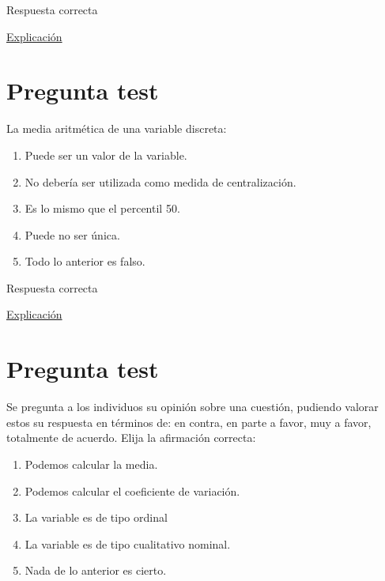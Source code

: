 \documentclass[
]{book}
\providecommand{\tightlist}{%
  \setlength{\itemsep}{0pt}\setlength{\parskip}{0pt}}
\begin{document}
Respuesta correcta

\href{https://1fjmanzano.github.io/bioestadistica/medidas-de-posicio\%CC\%81n-dispersio\%CC\%81n-y-forma.html\#medidas-de-posicio\%CC\%81n-no-centrales}{Explicación}

\hypertarget{pregunta-test-72}{%
\section{Pregunta test}\label{pregunta-test-72}}

La media aritmética de una variable discreta:

\begin{enumerate}
\def\labelenumi{\alph{enumi})}
\tightlist
\item
  Puede ser un valor de la variable.
\item
  No debería ser utilizada como medida de centralización.
\item
  Es lo mismo que el percentil 50.
\item
  Puede no ser única.
\item
  Todo lo anterior es falso.
\end{enumerate}

Respuesta correcta

\href{https://1fjmanzano.github.io/bioestadistica/medidas-de-posicio\%CC\%81n-dispersio\%CC\%81n-y-forma.html\#medidas-de-posicio\%CC\%81n-centrales}{Explicación}

\hypertarget{pregunta-test-73}{%
\section{Pregunta test}\label{pregunta-test-73}}

Se pregunta a los individuos su opinión sobre una cuestión, pudiendo valorar estos su respuesta en términos de: en contra, en parte a favor, muy a favor, totalmente de acuerdo. Elija la afirmación correcta:

\begin{enumerate}
\def\labelenumi{\alph{enumi})}
\tightlist
\item
  Podemos calcular la media.
\item
  Podemos calcular el coeficiente de variación.
\item
  La variable es de tipo ordinal
\item
  La variable es de tipo cualitativo nominal.
\item
  Nada de lo anterior es cierto.
\end{enumerate}
\end{document}
